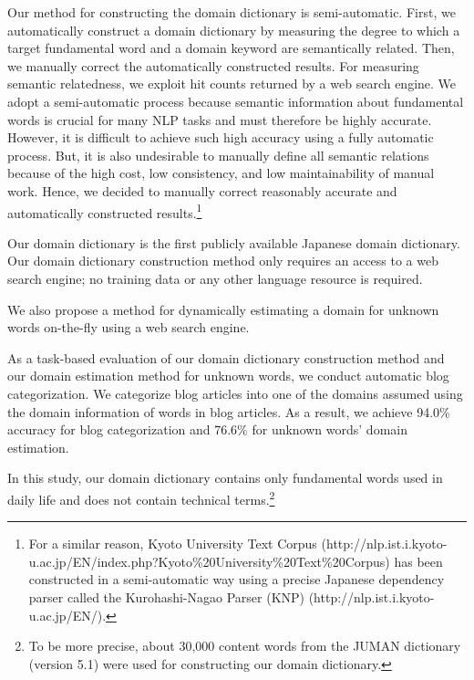 \documentclass[english]{jnlp_1.4_rep}
\begin{document}
Our method for constructing the domain dictionary is semi-automatic.
First, we automatically construct a domain dictionary by measuring 
the degree to which a target fundamental word and a domain keyword
are semantically related.
Then, we manually correct the automatically constructed results.
For measuring semantic relatedness, we exploit hit counts returned
by a web search engine.
We adopt a semi-automatic process because
semantic information about fundamental words is crucial for many NLP
tasks
and must therefore be highly accurate.
However, it is difficult to achieve such high accuracy using a
fully automatic process.
But, it is also undesirable to manually define all semantic relations
because of the high cost, low consistency, and low maintainability of
manual work.
Hence, we decided to manually correct reasonably accurate and
automatically constructed results.\footnote{
For a similar reason, Kyoto University Text Corpus (http://nlp.ist.i.kyoto-u.ac.jp/EN/index.php?Kyoto\linebreak[2]\%20University\%20Text\%20Corpus)
has been constructed in a semi-automatic way using a precise Japanese dependency parser 
called the Kurohashi-Nagao Parser (KNP) (http://nlp.ist.i.kyoto-u.ac.jp/EN/).}

Our domain dictionary is the first publicly available Japanese domain
dictionary.
Our domain dictionary construction method only requires an
access to a web search engine; no training data or any other language
resource is required.

We also propose a method for dynamically estimating a domain for
unknown words on-the-fly using a web search engine.

As a task-based evaluation of our domain dictionary construction method
and our domain estimation method for unknown words, we conduct automatic
blog categorization.
We categorize blog articles into one of the domains
assumed using the domain information of words in blog
articles. 
As a result, we achieve 94.0\% accuracy for blog
categorization and 76.6\% for unknown words' domain estimation.

In this study, our domain dictionary contains only fundamental words
used in daily life and does not contain technical
terms.\footnote{
To be more precise, about 30,000 content words from the JUMAN 
dictionary
\cite{Kurohashi:Nakamura:Matsumoto:Nagao:1994} (version 5.1)
were used for constructing our domain dictionary.}
\end{document}

